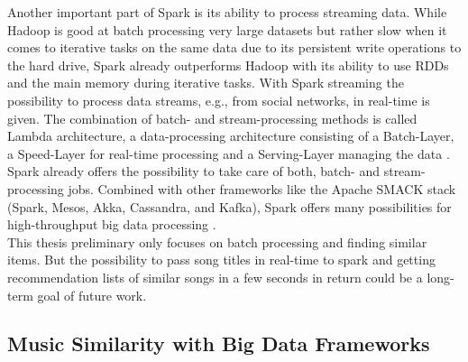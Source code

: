 \noindent Another important part of Spark is its ability to process streaming data. While Hadoop is good at batch processing very large datasets but rather slow when it comes to iterative tasks on the same data due to its persistent write operations to the hard drive, Spark already outperforms Hadoop with its ability to use RDDs and the main memory during iterative tasks. 
With Spark streaming the possibility to process data streams, e.g., from social networks, in real-time is given. 
The combination of batch- and stream-processing methods is called Lambda architecture, a data-processing architecture consisting of a Batch-Layer, a Speed-Layer for real-time processing and a Serving-Layer managing the data \cite[pp. 8 f]{nextgenbig}. Spark already offers the possibility to take care of both, batch- and stream-processing jobs. Combined with other frameworks like the Apache SMACK stack (Spark, Mesos, Akka, Cassandra, and Kafka), Spark offers many possibilities for high-throughput big data processing \cite[p. 5]{smack}.\\
This thesis preliminary only focuses on batch processing and finding similar items. But the possibility to pass song titles in real-time to spark and getting recommendation lists of similar songs in a few seconds in return could be a long-term goal of future work.\\

\subsection{Music Similarity with Big Data Frameworks}

